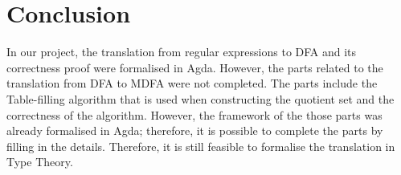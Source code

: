 \chapter{Conclusion}
\par In our project, the translation from regular expressions to DFA
and its correctness proof were formalised in Agda. However, the parts
related to the translation from DFA to MDFA were not completed. The
parts include the Table-filling algorithm that is used when
constructing the quotient set and the correctness of the
algorithm. However, the framework of the those parts was already formalised
in Agda; therefore, it is possible to complete the parts by filling in
the details. Therefore, it is still feasible to formalise the translation in
Type Theory. 